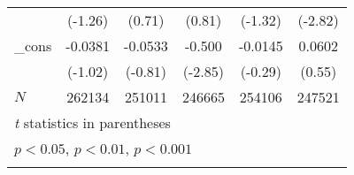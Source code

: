 {\begin{longtable}{l*{5}{c}}
            &     (-1.26)         &      (0.71)         &      (0.81)         &     (-1.32)         &     (-2.82)         \\
\_cons      &     -0.0381         &     -0.0533         &      -0.500\sym{**} &     -0.0145         &      0.0602         \\
            &     (-1.02)         &     (-0.81)         &     (-2.85)         &     (-0.29)         &      (0.55)         \\
\hline
\(N\)       &      262134         &      251011         &      246665         &      254106         &      247521         \\
\hline\hline
\multicolumn{6}{l}{\footnotesize \textit{t} statistics in parentheses}\\
\multicolumn{6}{l}{\footnotesize \sym{*} \(p<0.05\), \sym{**} \(p<0.01\), \sym{***} \(p<0.001\)}\\
\label{tab:oaxaca_female}
\end{longtable}
}
